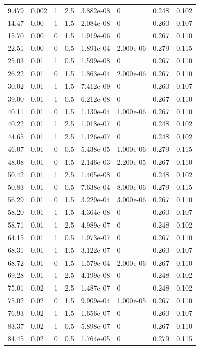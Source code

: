 \documentclass[preview]{standalone}
\begin{document}
{{\begin{tabular}{L{1.2cm}C{1.2cm} C{0.3cm}C{0.5cm} C{1.4cm}C{1.4cm} C{1.4cm}C{1.4cm}}
  9.479  &  0.002  & 1     & 2.5 &  3.882e-08  & 0  & 0.248 &  0.102   \\ 
  14.47  &  0.00  & 1     & 1.5 &  2.084e-08  & 0  & 0.260 &  0.107   \\ 
  15.70  &  0.00  & 0     & 1.5 &  1.919e-06  & 0  & 0.267 &  0.110   \\ 
  22.51  &  0.00  & 0     & 0.5 &  1.891e-04  & 2.000e-06  & 0.279 &  0.115   \\ 
  25.03  &  0.01  & 1     & 0.5 &  1.599e-08  & 0  & 0.267 &  0.110   \\ 
  26.22  &  0.01  & 0     & 1.5 &  1.863e-04  & 2.000e-06  & 0.267 &  0.110   \\ 
  30.02  &  0.01  & 1     & 1.5 &  7.412e-09  & 0  & 0.260 &  0.107   \\ 
  39.00  &  0.01  & 1     & 0.5 &  6.212e-08  & 0  & 0.267 &  0.110   \\ 
  40.11  &  0.01  & 0     & 1.5 &  1.130e-04  & 1.000e-06  & 0.267 &  0.110   \\ 
  40.22  &  0.01  & 1     & 2.5 &  1.018e-07  & 0  & 0.248 &  0.102   \\ 
  44.65  &  0.01  & 1     & 2.5 &  1.126e-07  & 0  & 0.248 &  0.102   \\ 
  46.07  &  0.01  & 0     & 0.5 &  5.438e-05  & 1.000e-06  & 0.279 &  0.115   \\ 
  48.08  &  0.01  & 0     & 1.5 &  2.146e-03  & 2.200e-05  & 0.267 &  0.110   \\ 
  50.42  &  0.01  & 1     & 2.5 &  1.405e-08  & 0  & 0.248 &  0.102   \\ 
  50.83  &  0.01  & 0     & 0.5 &  7.638e-04  & 8.000e-06  & 0.279 &  0.115   \\ 
  56.29  &  0.01  & 0     & 1.5 &  3.229e-04  & 3.000e-06  & 0.267 &  0.110   \\ 
  58.20  &  0.01  & 1     & 1.5 &  4.364e-08  & 0  & 0.260 &  0.107   \\ 
  58.71  &  0.01  & 1     & 2.5 &  4.989e-07  & 0  & 0.248 &  0.102   \\ 
  64.15  &  0.01  & 1     & 0.5 &  1.973e-07  & 0  & 0.267 &  0.110   \\ 
  68.31  &  0.01  & 1     & 1.5 &  3.122e-07  & 0  & 0.260 &  0.107   \\ 
  68.72  &  0.01  & 0     & 1.5 &  1.579e-04  & 2.000e-06  & 0.267 &  0.110   \\ 
  69.28  &  0.01  & 1     & 2.5 &  4.199e-08  & 0  & 0.248 &  0.102   \\ 
  75.01  &  0.02  & 1     & 2.5 &  1.487e-07  & 0  & 0.248 &  0.102   \\ 
  75.02  &  0.02  & 0     & 1.5 &  9.909e-04  & 1.000e-05  & 0.267 &  0.110   \\ 
  76.93  &  0.02  & 1     & 1.5 &  1.656e-07  & 0  & 0.260 &  0.107   \\ 
  83.37  &  0.02  & 1     & 0.5 &  5.898e-07  & 0  & 0.267 &  0.110   \\ 
  84.45  &  0.02  & 0     & 0.5 &  1.764e-05  & 0  & 0.279 &  0.115   \\ 
\hline 
\end{tabular} 

}}
\end{document}
